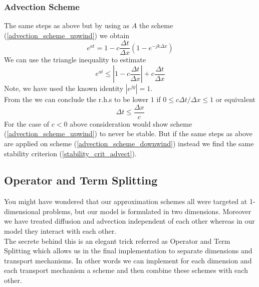 \documentclass[]{article}
\begin{document}
\subsubsection{Advection Scheme}
The same steps as above but by using as $A$ the scheme (\ref{advection_scheme_upwind}) we obtain
\begin{equation*}
e^{at}=1-c\frac{\Delta t}{\Delta x}\left(1-e^{-jk\Delta x}\right)
\end{equation*}
We can use the triangle inequality to estimate
\begin{equation*}
e^{at}\leq \left|1-c\frac{\Delta t}{\Delta x}\right| + c\frac{\Delta t}{\Delta x}
\end{equation*}
Note, we have used the known identity $|e^{jy}|=1$.\\
From the we can conclude the r.h.s to be lower $1$ if $0\leq c\Delta t/\Delta x\leq 1$ or equivalent
\begin{equation} \label{stability_crit_advect}
\Delta t\leq \frac{\Delta x}{c}
\end{equation}
For the case of $c<0$ above consideration would show scheme (\ref{advection_scheme_upwind}) to never be stable. But if the same steps as above are applied on scheme (\ref{advection_scheme_downwind}) instead we find the same stability criterion (\ref{stability_crit_advect}).

\subsection{Operator and Term Splitting}
You might have wondered that our approximation schemes all were targeted at 1-dimensional problems, but our model is formulated in two dimensions. Moreover
we have treated diffusion and advection independent of each other whereas in our
model they interact with each other.\\
The secrete behind this is an elegant trick referred as Operator and Term Splitting which allows us in the final implementation to separate dimensions and
transport mechanisms. In other words we can implement for each dimension and each
transport mechanism a scheme and then combine these schemes with each other.\\
\end{document}
